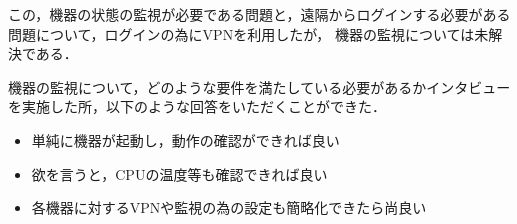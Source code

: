 この，機器の状態の監視が必要である問題と，遠隔からログインする必要がある問題について，ログインの為にVPNを利用したが，
機器の監視については未解決である．

機器の監視について，どのような要件を満たしている必要があるかインタビューを実施した所，以下のような回答をいただくことができた．
\begin{itemize}
\item 単純に機器が起動し，動作の確認ができれば良い
\item 欲を言うと，CPUの温度等も確認できれば良い
\item 各機器に対するVPNや監視の為の設定も簡略化できたら尚良い
\end{itemize}

